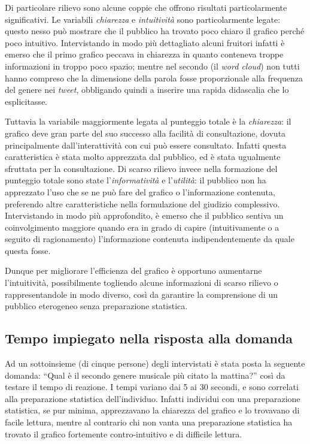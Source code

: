\documentclass[12pt, a4paper, twocolumn]{article} %
\begin{document}
Di particolare rilievo sono alcune coppie che offrono risultati particolarmente significativi.
Le variabili \textit{chiarezza} e \textit{intuitività} sono particolarmente legate: questo nesso può mostrare che il pubblico ha trovato poco chiaro il grafico perché poco intuitivo.
Intervistando in modo più dettagliato alcuni fruitori infatti è emerso che il primo grafico peccava in chiarezza in quanto conteneva troppe informazioni in troppo poco spazio; mentre nel secondo (il \textit{word cloud}) non tutti hanno compreso che la dimensione della parola fosse proporzionale alla frequenza del genere nei \textit{tweet}, obbligando quindi a inserire una rapida didascalia che lo esplicitasse.

Tuttavia la variabile maggiormente legata al punteggio totale è la \textit{chiarezza}: il grafico deve gran parte del suo successo alla facilità di consultazione, dovuta principalmente dall'interattività con cui può essere consultato.
Infatti questa caratteristica è stata molto apprezzata dal pubblico, ed è stata ugualmente sfruttata per la consultazione.
Di scarso rilievo invece nella formazione del punteggio totale sono state l'\textit{informatività} e l'\textit{utilità}: il pubblico non ha apprezzato l'uso che se ne può fare del grafico o l'informazione contenuta, preferendo altre caratteristiche nella formulazione del giudizio complessivo.
Intervistando in modo più approfondito, è emerso che il pubblico sentiva un coinvolgimento maggiore quando era in grado di capire (intuitivamente o a seguito di ragionamento) l'informazione contenuta indipendentemente da quale questa fosse.

Dunque per migliorare l'efficienza del grafico è opportuno aumentarne l'intuitività, possibilmente togliendo alcune informazioni di scarso rilievo o rappresentandole in modo diverso, così da garantire la comprensione di un pubblico eterogeneo senza preparazione statistica.

\subsection{Tempo impiegato nella risposta alla domanda}
Ad un sottoinsieme (di cinque persone) degli intervistati è stata posta la seguente domanda: ``Qual è il secondo genere musicale più citato la mattina?'' così da testare il tempo di reazione.
I tempi variano dai 5 ai 30 secondi, e sono correlati alla preparazione statistica dell'individuo.
Infatti individui con una preparazione statistica, se pur minima, apprezzavano la chiarezza del grafico e lo trovavano di facile lettura, mentre al contrario chi non vanta una preparazione statistica ha trovato il grafico fortemente contro-intuitivo e di difficile lettura.
\end{document}
